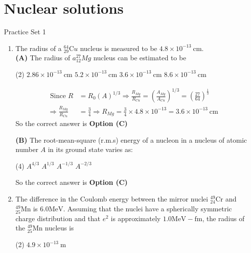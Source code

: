 \chapter{Nuclear solutions}
\begin{abox}
	Practice Set 1 
	\end{abox}
\begin{enumerate}
	\item  The radius of a ${ }_{29}^{64} \mathrm{C} u$ nucleus is measured to be $4.8 \times 10^{-13} \mathrm{~cm}$.\\
	\textbf{(A)} The radius of $a{ }_{12}^{27} M g$ nucleus can be estimated to be
{	}
\begin{tasks}(2)
\task[\textbf{A.}] $2.86 \times 10^{-13} \mathrm{~cm}$
\task[\textbf{B.}] $5.2 \times 10^{-13} \mathrm{~cm}$
\task[\textbf{C.}] $3.6 \times 10^{-13} \mathrm{~cm}$
\task[\textbf{D.}] $8.6 \times 10^{-13} \mathrm{~cm}$
\end{tasks}
\begin{answer}
\begin{align*}
\text{	Since }R&=R_{0}(A)^{1 / 3} \Rightarrow \frac{R_{M g}}{R_{C u}}=\left(\frac{A_{M g}}{A_{C u}}\right)^{1 / 3}=\left( \frac{27}{64}\right) ^\frac{1}{3}\\
\Rightarrow \frac{R_{M g}}{R_{C u}}&=\frac{3}{4} \Rightarrow R_{M g}=\frac{3}{4} \times 4.8 \times 10^{-13}=3.6 \times 10^{-13} \mathrm{~cm}
\end{align*}
So the correct answer is \textbf{Option (C)}
\end{answer}
\textbf{(B)} The root-mean-square (r.m.s) energy of a nucleon in a nucleus of atomic number $A$ in its ground state varies as:
\begin{tasks}(4)
\task[\textbf{A.}] $A^{4 / 3}$
\task[\textbf{B.}] $A^{1 / 3}$
\task[\textbf{C.}] $A^{-1 / 3}$
\task[\textbf{D.}] $A^{-2 / 3}$
\end{tasks}
\begin{answer}
So the correct answer is \textbf{Option (C)}
\end{answer}
\item The difference in the Coulomb energy between the mirror nuclei ${ }_{24}^{49} \mathrm{Cr}$ and ${ }_{25}^{49} \mathrm{Mn}$ is $6.0 \mathrm{MeV}$. Assuming that the nuclei have a spherically symmetric charge distribution and that $e^{2}$ is approximately $1.0 \mathrm{MeV}-\mathrm{fm}$, the radius of the ${ }_{25}^{49} \mathrm{Mn}$ nucleus is
{}
\begin{tasks}(2)
\task[\textbf{A.}] $4.9 \times 10^{-13} \mathrm{~m}$

\end{tasks}
\end{enumerate}
